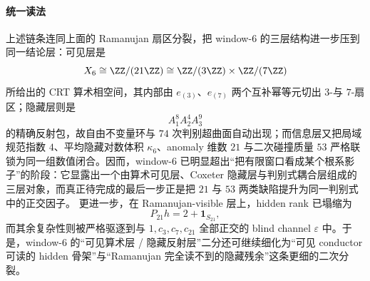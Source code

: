 

\paragraph{统一读法}
上述链条连同上面的 Ramanujan 扇区分裂，把 window-\(6\) 的三层结构进一步压到同一结论层：可见层是
\[
X_6\cong \ZZ/(21\ZZ)\cong \ZZ/(3\ZZ)\times \ZZ/(7\ZZ)
\]
所给出的 CRT 算术相空间，其内部由 \(e_{(3)}\)、\(e_{(7)}\) 两个互补幂等元切出 \(3\)-与 \(7\)-扇区；隐藏层则是
\[
A_1^8A_2^4A_3^9
\]
的精确反射包，故自由不变量环与 \(74\) 次判别超曲面自动出现；而信息层又把局域规范指数 \(4\)、平均隐藏对数体积 \(\kappa_6\)、anomaly 维数 \(21\) 与二次碰撞质量 \(53\) 严格联锁为同一组数值闭合。因而，window-\(6\) 已明显超出“把有限窗口看成某个根系影子”的阶段：它显露出一个由算术可见层、Coxeter 隐藏层与判别式耦合层组成的三层对象，而真正待完成的最后一步正是把 \(21\) 与 \(53\) 两类缺陷提升为同一判别式中的正交因子。
更进一步，在 Ramanujan-visible 层上，hidden rank 已塌缩为
\[
P_{21}h=2+\mathbf 1_{S_{21}},
\]
而其余复杂性则被严格驱逐到与 \(1,c_3,c_7,c_{21}\) 全部正交的 blind channel \(\varepsilon\) 中。于是，window-\(6\) 的“可见算术层 / 隐藏反射层”二分还可继续细化为“可见 conductor 可读的 hidden 骨架”与“Ramanujan 完全读不到的隐藏残余”这条更细的二次分裂。

\endinput
